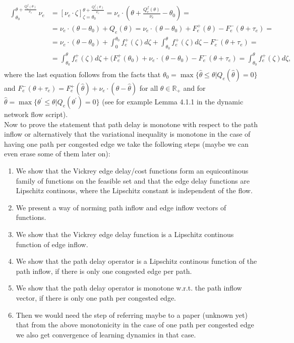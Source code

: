 \documentclass[reqno,openany]{amsbook}
\theoremstyle{definition}
\theoremstyle{plain}
\begin{document}
\begin{align}
	\begin{split}
		\int_{\theta_0}^{\theta + \frac{Q_e^f(\theta)}{\nu_e}} \nu_e &= [ \nu_e \cdot \zeta ]_{\zeta = \theta_0}^{\theta + 
		\frac{Q_e^f(\theta)}{\nu_e}} = \nu_e \cdot (\theta + \frac{Q_e^f(\theta)}{\nu_e} - \theta_0) =\\
		&= \nu_e \cdot (\theta - \theta_0) + Q_e(\theta) = \nu_e \cdot (\theta - \theta_0) + F_e^+(\theta) - F_e^-(\theta + 
		\tau_e) =\\
		&= \nu_e \cdot (\theta - \theta_0) + \int_0^{\theta_0} f_e^+(\zeta) d\zeta + \int_{\theta_0}^{\theta} f_e^+(\zeta)
		d\zeta - F_e^-(\theta + \tau_e) =\\
		&= \int_{\theta_0}^{\theta} f_e^+(\zeta) d\zeta + (F_e^+(\theta_0) + \nu_e \cdot (\theta - \theta_0) - F_e^-(\theta + 
		\tau_e) = \int_{\theta_0}^{\theta} f_e^+(\zeta) d\zeta,
	\end{split}
\end{align}
where the last equation follows from the facts that $\theta_0 = \max\{\hat{\theta} \leq \theta \vert Q_e(\hat{\theta}) = 0\}$ and 
$F_e^-(\theta + \tau_e) = F_e^+(\hat{\theta}) + \nu_e \cdot (\theta - \hat{\theta})$ for all $\theta \in \mathbb{R}_+$ and for 
$\hat{\theta} = \max\{\theta^{\prime} \leq \theta \vert Q_e(\theta^{\prime}) = 0\}$ (see for example Lemma 4.1.1 in the dynamic network flow script).\\
Now to prove the statement that path delay is monotone with respect to the path inflow or alternatively that the variational inequality is monotone in the case of having one path per congested edge we take the following steps (maybe we can even erase some of them later on): 
\begin{enumerate}
	\item{We show that the Vickrey edge delay/cost functions form an equicontinous family of functions on the feasible set and that 
	the edge delay functions are Lipschitz continous, where the Lipschitz constant is independent of the flow.}
	\item{We present a way of norming path inflow and edge inflow vectors of functions.}
	\item{We show that the Vickrey edge delay function is a Lipschitz continous function of edge inflow.}
	\item{We show that the path delay operator is a Lipschitz continous function of the path inflow, if there is only one congested
	edge per path.}
	\item{We show that the path delay operator is monotone w.r.t. the path inflow vector, if there is only one path per congested 
	edge.}
	\item{Then we would need the step of referring maybe to a paper (unknown yet) that from the above monotonicity in the case 
	of one path per congested edge we also get convergence of learning dynamics in that case.}
\end{enumerate}
\end{document}
